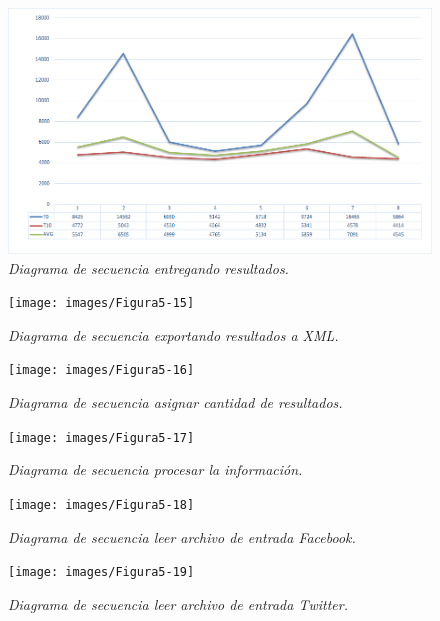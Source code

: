 \begin{figure}[H]
	\centering
	\includegraphics[scale=1]{images/Figura5-14}
	\caption{\em Diagrama de secuencia entregando resultados.}
	\label{fig:des-im14}
\end{figure}

\begin{figure}[H]
	\centering
	\texttt{[image: images/Figura5-15]}
	\caption{\em Diagrama de secuencia exportando resultados a XML.}
	\label{fig:des-im15}
\end{figure}

\begin{figure}[H]
	\centering
	\texttt{[image: images/Figura5-16]}
	\caption{\em Diagrama de secuencia asignar cantidad de resultados.}
	\label{fig:des-im16}
\end{figure}

\begin{landscape}
\begin{figure}[H]
	\centering
	\texttt{[image: images/Figura5-17]}
	\caption{\em Diagrama de secuencia procesar la información.}
	\label{fig:des-im17}
\end{figure}
\end{landscape}

\begin{landscape}
\begin{figure}[H]
	\centering
	\texttt{[image: images/Figura5-18]}
	\caption{\em Diagrama de secuencia leer archivo de entrada Facebook.}
	\label{fig:des-im18}
\end{figure}
\end{landscape}

\begin{landscape}
\begin{figure}[H]
	\centering
	\texttt{[image: images/Figura5-19]}
	\caption{\em Diagrama de secuencia leer archivo de entrada Twitter.}
	\label{fig:des-im19}
\end{figure}
\end{landscape}
